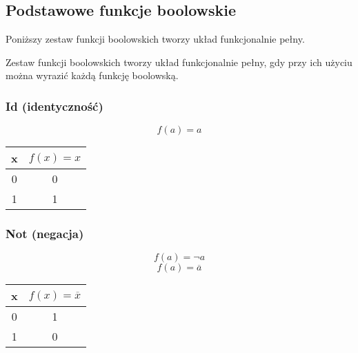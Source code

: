 \subsection{Podstawowe funkcje boolowskie}
Poniższy zestaw funkcji boolowskich tworzy układ funkcjonalnie pełny.
\begin{definition}
    Zestaw funkcji boolowskich tworzy układ funkcjonalnie pełny, gdy przy ich użyciu można wyrazić każdą funkcję boolowską.
\end{definition}
\begin{multicols}{2}
\subsubsection{Id (identyczność)}
\[f(a) = a\]
\begin{center}
    \begin{tabular}{| c | c |}
        \hline
        x & $f(x) = x$ \\ 
        \hline
        0 & 0 \\ 
        1 & 1 \\ 
        \hline 
    \end{tabular}
\end{center}
\subsubsection{Not (negacja)}
\[f(a) = \neg a\]
\[f(a) = \overline{a}\]
\begin{center}
    \begin{tabular}{| c | c |}
        \hline
        x & $f(x) = \overline{x}$ \\ 
        \hline
        0 & 1 \\ 
        1 & 0 \\ 
        \hline 
    \end{tabular}
\end{center}
\end{multicols}
